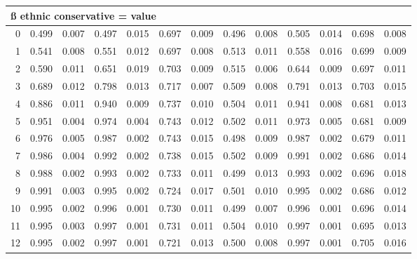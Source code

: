 \documentclass[
]{article}
\begin{document}
\begin{table}[H]
{\begin{tabular}[t]{r|r|r|r|r|r|r|r|r|r|r|r|r}
\multicolumn{13}{l}{\textbf{ß ethnic conservative = value}}\\
\hline
\hspace{1em}0 & 0.499 & 0.007 & 0.497 & 0.015 & 0.697 & 0.009 & 0.496 & 0.008 & 0.505 & 0.014 & 0.698 & 0.008\\
\hline
\hspace{1em}1 & 0.541 & 0.008 & 0.551 & 0.012 & 0.697 & 0.008 & 0.513 & 0.011 & 0.558 & 0.016 & 0.699 & 0.009\\
\hline
\hspace{1em}2 & 0.590 & 0.011 & 0.651 & 0.019 & 0.703 & 0.009 & 0.515 & 0.006 & 0.644 & 0.009 & 0.697 & 0.011\\
\hline
\hspace{1em}3 & 0.689 & 0.012 & 0.798 & 0.013 & 0.717 & 0.007 & 0.509 & 0.008 & 0.791 & 0.013 & 0.703 & 0.015\\
\hline
\hspace{1em}4 & 0.886 & 0.011 & 0.940 & 0.009 & 0.737 & 0.010 & 0.504 & 0.011 & 0.941 & 0.008 & 0.681 & 0.013\\
\hline
\hspace{1em}5 & 0.951 & 0.004 & 0.974 & 0.004 & 0.743 & 0.012 & 0.502 & 0.011 & 0.973 & 0.005 & 0.681 & 0.009\\
\hline
\hspace{1em}6 & 0.976 & 0.005 & 0.987 & 0.002 & 0.743 & 0.015 & 0.498 & 0.009 & 0.987 & 0.002 & 0.679 & 0.011\\
\hline
\hspace{1em}7 & 0.986 & 0.004 & 0.992 & 0.002 & 0.738 & 0.015 & 0.502 & 0.009 & 0.991 & 0.002 & 0.686 & 0.014\\
\hline
\hspace{1em}8 & 0.988 & 0.002 & 0.993 & 0.002 & 0.733 & 0.011 & 0.499 & 0.013 & 0.993 & 0.002 & 0.696 & 0.018\\
\hline
\hspace{1em}9 & 0.991 & 0.003 & 0.995 & 0.002 & 0.724 & 0.017 & 0.501 & 0.010 & 0.995 & 0.002 & 0.686 & 0.012\\
\hline
\hspace{1em}10 & 0.995 & 0.002 & 0.996 & 0.001 & 0.730 & 0.011 & 0.499 & 0.007 & 0.996 & 0.001 & 0.696 & 0.014\\
\hline
\hspace{1em}11 & 0.995 & 0.003 & 0.997 & 0.001 & 0.731 & 0.011 & 0.504 & 0.010 & 0.997 & 0.001 & 0.695 & 0.013\\
\hline
\hspace{1em}12 & 0.995 & 0.002 & 0.997 & 0.001 & 0.721 & 0.013 & 0.500 & 0.008 & 0.997 & 0.001 & 0.705 & 0.016\\

\end{tabular}}
\end{table}
\end{document}
